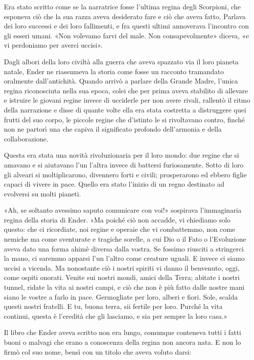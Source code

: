 {Era stato scritto come se la narratrice fosse l'ultima regina degli
	Scorpioni, che esponeva ciò che la sua razza aveva desiderato fare e ciò
	che aveva fatto. Parlava dei loro successi e dei loro fallimenti, e fra
	questi ultimi annoverava l'incontro con gli esseri umani. «Non volevamo
	farvi del male. Non consapevolmente» diceva, «e vi perdoniamo per averci
	uccisi».}

{Dagli albori della loro civiltà alla guerra che aveva spazzato via il
	loro pianeta natale, Ender ne riassumeva la storia come fosse un
	racconto tramandato oralmente dall'antichità. Quando arrivò a parlare
	della Grande Madre, l'unica regina riconosciuta nella sua epoca, colei
	che per prima aveva stabilito di allevare e istruire le giovani regine
	invece di ucciderle per non avere rivali, rallentò il ritmo della
	narrazione e disse di quante volte ella era stata costretta a
	distruggere quei frutti del suo corpo, le piccole regine che d'istinto
	le si rivoltavano contro, finché non ne partorì una che capiva il
	significato profondo dell'armonia e della collaborazione.}

{Questa era stata una novità rivoluzionaria per il loro mondo: due
	regine che si amavano e si aiutavano l'un l'altra invece di battersi
	furiosamente. Sotto di loro gli alveari si moltiplicarono, divennero
	forti e civili; prosperarono ed ebbero figlie capaci di vivere in pace.
	Quello era stato l'inizio di un regno destinato ad evolversi su molti
	pianeti.}

{«Ah, se soltanto avessimo saputo comunicare con voi!» sospirava
	l'immaginaria regina della storia di Ender. «Ma poiché ciò non accadde,
	vi chiediamo solo questo: che ci ricordiate, noi regine e operaie che vi
	combattemmo, non come nemiche ma come sventurate e tragiche sorelle, a
	cui Dio o il Fato o l'Evoluzione aveva dato una forma ahimè diversa
	dalla vostra. Se fossimo riusciti a stringerci la mano, ci saremmo
	apparsi l'un l'altro come creature uguali. E invece ci siamo uccisi a
	vicenda. Ma nonostante ciò i nostri spiriti vi danno il benvenuto, oggi,
	come ospiti onorati. Venite sui nostri mondi, amici della Terra; abitate
	i nostri tunnel, ridate la vita ai nostri campi, e ciò che non è più
	fatto dalle nostre mani siano le vostre a farlo in pace. Germogliate per
	loro, alberi e fiori. Sole, scalda questi nostri fratelli. E tu, buona
	terra, sii fertile per loro. Purché la vita continui, questa è l'eredità
	che gli lasciamo, e sia per sempre la loro casa.»}

{Il libro che Ender aveva scritto non era lungo, comunque conteneva
	tutti i fatti buoni o malvagi che erano a conoscenza della regina non
	ancora nata. E non lo firmò col suo nome, bensì con un titolo che aveva
	voluto darsi:}

